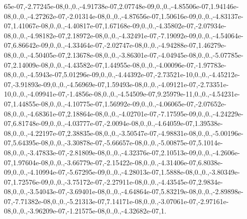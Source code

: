 \begin{DoxyCompactItemize}
65e-\/07,-\/2.\-77245e-\/08,0.,0.,-\/4.\-91738e-\/07,2.\-07748e-\/09,0.,0.,-\/4.\-85506e-\/07,1.\-94146e-\/08,0.,0.,-\/4.\-27262e-\/07,-\/2.\-01314e-\/08,0.,0.,-\/4.\-87656e-\/07,1.\-50616e-\/09,0.,0.,-\/4.\-83137e-\/07,1.\-41067e-\/08,0.,0.,-\/4.\-40817e-\/07,1.\-67168e-\/09,0.,0.,-\/4.\-35802e-\/07,-\/2.\-07934e-\/08,0.,0.,-\/4.\-98182e-\/07,2.\-18972e-\/08,0.,0.,-\/4.\-32491e-\/07,-\/7.\-19092e-\/09,0.,0.,-\/4.\-54064e-\/07,6.\-86642e-\/09,0.,0.,-\/4.\-33464e-\/07,-\/2.\-02747e-\/08,0.,0.,-\/4.\-94288e-\/07,1.\-46279e-\/08,0.,0.,-\/4.\-50405e-\/07,2.\-13678e-\/08,0.,0.,-\/3.\-86301e-\/07,-\/4.\-04945e-\/08,0.,0.,-\/5.\-07785e-\/07,2.\-14009e-\/08,0.,0.,-\/4.\-43582e-\/07,1.\-44955e-\/08,0.,0.,-\/4.\-00096e-\/07,-\/1.\-97783e-\/08,0.,0.,-\/4.\-5943e-\/07,5.\-01296e-\/09,0.,0.,-\/4.\-44392e-\/07,-\/2.\-73521e-\/10,0.,0.,-\/4.\-45212e-\/07,-\/3.\-91893e-\/09,0.,0.,-\/4.\-56969e-\/07,1.\-59493e-\/08,0.,0.,-\/4.\-09121e-\/07,-\/2.\-73351e-\/10,0.,0.,-\/4.\-09941e-\/07,-\/1.\-4856e-\/08,0.,0.,-\/4.\-54509e-\/07,9.\-25979e-\/11,0.,0.,-\/4.\-54231e-\/07,1.\-44855e-\/08,0.,0.,-\/4.\-10775e-\/07,1.\-56992e-\/09,0.,0.,-\/4.\-06065e-\/07,-\/2.\-07652e-\/08,0.,0.,-\/4.\-68361e-\/07,2.\-18864e-\/08,0.,0.,-\/4.\-02701e-\/07,-\/7.\-17595e-\/09,0.,0.,-\/4.\-24229e-\/07,6.\-81748e-\/09,0.,0.,-\/4.\-03777e-\/07,-\/2.\-0094e-\/08,0.,0.,-\/4.\-64059e-\/07,1.\-39538e-\/08,0.,0.,-\/4.\-22197e-\/07,2.\-38835e-\/08,0.,0.,-\/3.\-50547e-\/07,-\/4.\-98831e-\/08,0.,0.,-\/5.\-00196e-\/07,5.\-64395e-\/08,0.,0.,-\/3.\-30878e-\/07,-\/5.\-66657e-\/08,0.,0.,-\/5.\-00875e-\/07,5.\-1014e-\/08,0.,0.,-\/3.\-47833e-\/07,-\/2.\-81809e-\/08,0.,0.,-\/4.\-32376e-\/07,2.\-10513e-\/09,0.,0.,-\/4.\-2606e-\/07,1.\-97604e-\/08,0.,0.,-\/3.\-66779e-\/07,-\/2.\-15422e-\/08,0.,0.,-\/4.\-31406e-\/07,6.\-8038e-\/09,0.,0.,-\/4.\-10994e-\/07,-\/5.\-67295e-\/09,0.,0.,-\/4.\-28013e-\/07,1.\-5888e-\/08,0.,0.,-\/3.\-80349e-\/07,1.\-72576e-\/09,0.,0.,-\/3.\-75172e-\/07,-\/2.\-27911e-\/08,0.,0.,-\/4.\-43545e-\/07,2.\-9834e-\/08,0.,0.,-\/3.\-54043e-\/07,-\/3.\-69401e-\/08,0.,0.,-\/4.\-64864e-\/07,5.\-83219e-\/08,0.,0.,-\/2.\-89898e-\/07,-\/7.\-71382e-\/08,0.,0.,-\/5.\-21313e-\/07,7.\-14171e-\/08,0.,0.,-\/3.\-07061e-\/07,-\/2.\-97161e-\/08,0.,0.,-\/3.\-96209e-\/07,-\/1.\-21575e-\/08,0.,0.,-\/4.\-32682e-\/07,1.
\end{DoxyCompactItemize}
